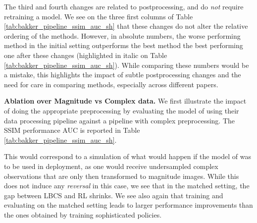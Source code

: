 The third and fourth changes are related to postprocessing, and do \textit{not} require retraining a model. We see on the three first columns of Table \ref{tab:bakker_pipeline_ssim_auc_sh} that these changes do not alter the relative ordering of the methods. However, in absolute numbers, the worse performing method in the initial setting outperforms the best method the best performing one after these changes (highlighted in italic on Table \ref{tab:bakker_pipeline_ssim_auc_sh}). While comparing these numbers would be a mistake, this highlights the impact of subtle postprocessing changes and the need for care in comparing methods, especially across different papers.

\textbf{Ablation over Magnitude vs Complex data.} We first illustrate the impact of doing the appropriate preprocessing by evaluating the model of \cite{bakker2020experimental} using their data processing pipeline against a pipeline with complex preprocessing. The SSIM performance AUC is reported in Table \ref{tab:bakker_pipeline_ssim_auc_sh}. 

This would correspond to a simulation of what would happen if the model of \cite{bakker2020experimental} was to be used in deployment, as one would receive undersampled complex observations that are only then transformed to magnitude images. While this does not induce any \textit{reversal} in this case, we see that in the matched setting, the gap between LBCS and RL shrinks. We see also again that training and evaluating on the matched setting leads to larger performance improvements than the ones obtained by training sophisticated policies.


